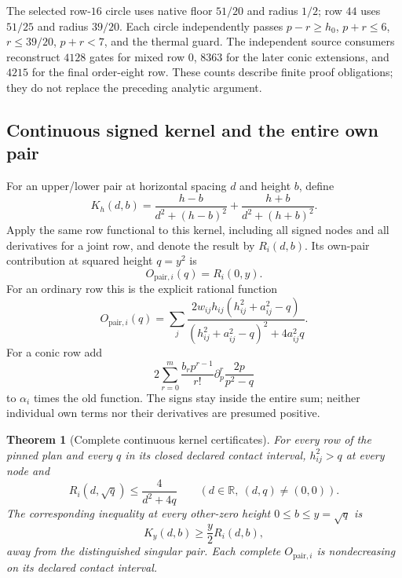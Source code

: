 \documentclass[11pt,a4paper]{article}
\newtheorem{theorem}{Theorem}[section]
\theoremstyle{definition}
\theoremstyle{remark}
\begin{document}
The selected row-$16$ circle uses native floor $51/20$ and radius $1/2$;
row $44$ uses $51/25$ and radius $39/20$.  Each circle independently
passes $p-r\geq h_0$, $p+r\leq6$, $r\leq39/20$, $p+r<7$, and the
thermal guard.  The independent source consumers reconstruct $4128$
gates for mixed row $0$, $8363$ for the later conic extensions, and
$4215$ for the final order-eight row.  These counts describe finite
proof obligations; they do not replace the preceding analytic argument.

\subsection{Continuous signed kernel and the entire own pair}
\label{src:geometry}

For an upper/lower pair at horizontal spacing $d$ and height $b$, define
\[
 K_h(d,b)=\frac{h-b}{d^2+(h-b)^2}
                         +\frac{h+b}{d^2+(h+b)^2}.
\]
Apply the same row functional to this kernel, including all signed nodes
and all derivatives for a joint row, and denote the result by
$R_i(d,b)$.  Its own-pair contribution at squared height $q=y^2$ is
\begin{equation}
 O_{\mathrm{pair},i}(q)=R_i(0,y).
 \label{src:own-def}
\end{equation}
For an ordinary row this is the explicit rational function
\begin{equation}
 O_{\mathrm{pair},i}(q)=\sum_j
 \frac{2w_{ij}h_{ij}(h_{ij}^2+a_{ij}^2-q)}
      {(h_{ij}^2+a_{ij}^2-q)^2+4a_{ij}^2q}.
 \label{src:own}
\end{equation}
For a conic row add
\[
 2\sum_{r=0}^m\frac{b_rp^{r-1}}{r!}
             \partial_p^r\frac{2p}{p^2-q}
\]
to $\alpha_i$ times the old function.  The signs stay inside the entire
sum; neither individual own terms nor their derivatives are presumed
positive.

\begin{theorem}[Complete continuous kernel certificates]
\label{src:kernel}
For every row of the pinned plan and every $q$ in its closed declared
contact interval, $h_{ij}^2>q$ at every node and
\begin{equation}
 R_i(d,\sqrt q)\leq\frac4{d^2+4q}
             \qquad(d\in\mathbb R,\ (d,q)\ne(0,0)).
 \label{src:boundary-kernel}
\end{equation}
The corresponding inequality at every other-zero height
$0\leq b\leq y=\sqrt q$ is
\begin{equation}
 K_y(d,b)\geq\frac y2R_i(d,b),
 \label{src:whole-kernel}
\end{equation}
away from the distinguished singular pair.  Each complete $O_{\mathrm{pair},i}$ is
nondecreasing on its declared contact interval.
\end{theorem}
\end{document}
